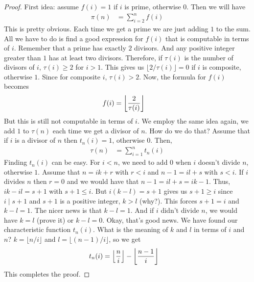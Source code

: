 		\begin{proof}
			First idea: assume $f(i)=1$ if $i$ is prime, otherwise $0$. Then we will have
				\begin{align*}
					\pi(n) & = \sum_{i=2}^{n}f(i)
				\end{align*}
			This is pretty obvious. Each time we get a prime we are just adding $1$ to the sum. All we have to do is find a good expression for $f(i)$ that is computable in terms of $i$. Remember that  a prime has exactly $2$ divisors. And any positive integer greater than $1$ has at least two divisors. Therefore, if $\tau(i)$ is the number of divisors of $i$, $\tau(i)\geq2$ for $i>1$. This gives us $\lfloor 2/\tau(i)\rfloor=0$ if $i$ is composite, otherwise $1$. Since for composite $i$, $\tau(i)>2$. Now, the formula for $f(i)$ becomes
				\begin{align*}
					f(i) & = \left\lfloor{\dfrac{2}{\tau(i)}}\right\rfloor
				\end{align*}
			But this is still not computable in terms of $i$. We employ the same idea again, we add $1$ to $\tau(n)$ each time we get a divisor of $n$. How do we do that? Assume that if $i$ is a divisor of $n$ then $t_n(i)=1$, otherwise $0$. Then,
				\begin{align*}
					\tau(n) & = \sum_{i=1}^{n}t_n(i)
				\end{align*}
			Finding $t_n(i)$ can be easy. For $i<n$, we need to add $0$ when $i$ doesn't divide $n$, otherwise $1$. Assume that $n=ik+r$ with $r<i$ and $n-1=il+s$ with $s<i$. If $i$ divides $n$ then $r=0$ and we would have that $n-1=il+s=ik-1$. Thus, $ik-il=s+1$ with $s+1\leq i$. But $i(k-l)=s+1$ gives us $s+1\geq i$ since $i\mid s+1$ and $s+1$ is a positive integer, $k>l$ (why?). This forces $s+1=i$ and $k-l=1$. The nicer news is that $k-l=1$. And if $i$ didn't divide $n$, we would have $k=l$ (prove it) or $k-l=0$. Okay, that's good news. We have found our characteristic function $t_n(i)$. What is the meaning of $k$ and $l$ in terms of $i$ and $n$? $k=\lfloor n/i\rfloor$ and $l=\lfloor (n-1)/i\rfloor$, so we get
				\begin{align*}
					t_n(i) & = \left\lfloor{\dfrac{n}{i}}\right\rfloor-\left\lfloor{\dfrac{n-1}{i}}\right\rfloor
				\end{align*}
			This completes the proof.
		\end{proof}
